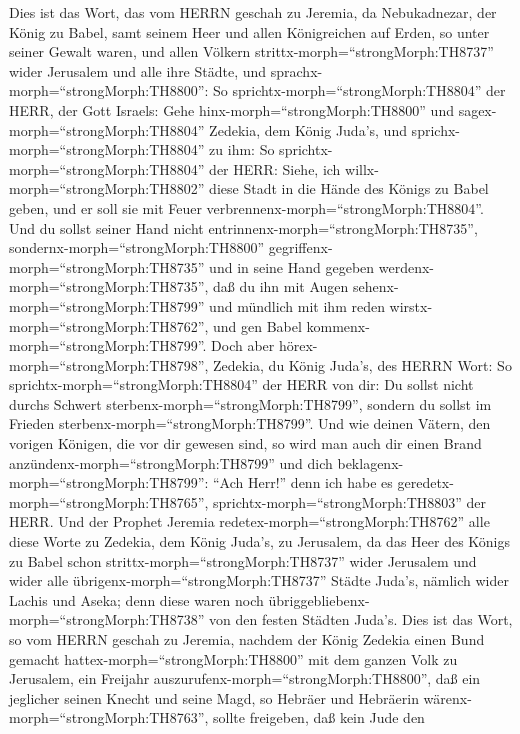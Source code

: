  Dies ist das Wort, das vom HERRN geschah zu Jeremia, da
Nebukadnezar, der König zu Babel, samt seinem Heer und allen
Königreichen auf Erden, so unter seiner Gewalt waren, und allen Völkern
strittx-morph=``strongMorph:TH8737'' wider Jerusalem und alle ihre
Städte, und sprachx-morph=``strongMorph:TH8800'':  So
sprichtx-morph=``strongMorph:TH8804'' der HERR, der Gott Israels: Gehe
hinx-morph=``strongMorph:TH8800'' und sagex-morph=``strongMorph:TH8804''
Zedekia, dem König Juda's, und sprichx-morph=``strongMorph:TH8804'' zu
ihm: So sprichtx-morph=``strongMorph:TH8804'' der HERR: Siehe, ich
willx-morph=``strongMorph:TH8802'' diese Stadt in die Hände des Königs
zu Babel geben, und er soll sie mit Feuer
verbrennenx-morph=``strongMorph:TH8804''.  Und du sollst
seiner Hand nicht entrinnenx-morph=``strongMorph:TH8735'',
sondernx-morph=``strongMorph:TH8800''
gegriffenx-morph=``strongMorph:TH8735'' und in seine Hand gegeben
werdenx-morph=``strongMorph:TH8735'', daß du ihn mit Augen
sehenx-morph=``strongMorph:TH8799'' und mündlich mit ihm reden
wirstx-morph=``strongMorph:TH8762'', und gen Babel
kommenx-morph=``strongMorph:TH8799''.  Doch aber
hörex-morph=``strongMorph:TH8798'', Zedekia, du König Juda's, des HERRN
Wort: So sprichtx-morph=``strongMorph:TH8804'' der HERR von dir: Du
sollst nicht durchs Schwert sterbenx-morph=``strongMorph:TH8799'',
 sondern du sollst im Frieden
sterbenx-morph=``strongMorph:TH8799''. Und wie deinen Vätern, den
vorigen Königen, die vor dir gewesen sind, so wird man auch dir einen
Brand anzündenx-morph=``strongMorph:TH8799'' und dich
beklagenx-morph=``strongMorph:TH8799'': ``Ach Herr!'' denn ich habe es
geredetx-morph=``strongMorph:TH8765'',
sprichtx-morph=``strongMorph:TH8803'' der HERR.  Und der
Prophet Jeremia redetex-morph=``strongMorph:TH8762'' alle diese Worte zu
Zedekia, dem König Juda's, zu Jerusalem,  da das Heer des
Königs zu Babel schon strittx-morph=``strongMorph:TH8737'' wider
Jerusalem und wider alle übrigenx-morph=``strongMorph:TH8737'' Städte
Juda's, nämlich wider Lachis und Aseka; denn diese waren noch
übriggebliebenx-morph=``strongMorph:TH8738'' von den festen Städten
Juda's.  Dies ist das Wort, so vom HERRN geschah zu Jeremia,
nachdem der König Zedekia einen Bund gemacht
hattex-morph=``strongMorph:TH8800'' mit dem ganzen Volk zu Jerusalem,
ein Freijahr auszurufenx-morph=``strongMorph:TH8800'',  daß
ein jeglicher seinen Knecht und seine Magd, so Hebräer und Hebräerin
wärenx-morph=``strongMorph:TH8763'', sollte freigeben, daß kein Jude den
